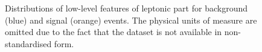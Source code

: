 \documentclass[../main/main.tex]{subfiles}
\begin{document}
\begin{figure}[!h]
\begin{minipage}[c]{0.20\linewidth}
{        }
    \end{minipage}%
    \begin{minipage}[c]{0.20\linewidth}
        \vspace{0pt}
        \centering
    \end{minipage}%
    \caption{Distributions of low-level features of leptonic part for background (blue) and signal (orange) events. The physical units of measure are omitted due to the fact that the dataset is not available in non-standardised form.}
    \label{fig:appendix_low_features_leptonic}
\end{figure}
\end{document}
